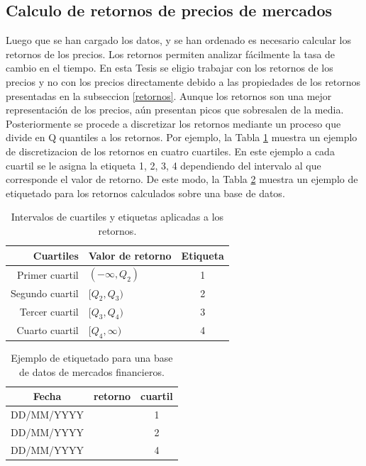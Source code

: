 \subsection{Calculo de retornos de precios de mercados}
\label{sec_retornos}
Luego que se han cargado los datos, y se han ordenado es necesario calcular los retornos de los precios. 
Los retornos permiten analizar fácilmente la tasa de cambio en el tiempo.
En esta Tesis se eligio trabajar con los retornos de los precios y no con los precios directamente debido a las propiedades de los retornos presentadas en la subseccion \ref{retornos}.
Aunque los retornos son una mejor representación de los precios, aún presentan picos que sobresalen de la media. 
Posteriormente se procede a discretizar los retornos mediante un proceso que divide en Q quantiles a los retornos.
Por ejemplo, la Tabla \ref{quantile_example} muestra un ejemplo de discretizacion de los retornos en cuatro cuartiles. 
En este ejemplo a cada cuartil se le asigna la etiqueta 1, 2, 3, 4 dependiendo del intervalo al que corresponde el valor de retorno.
De este modo, la Tabla \ref{ejemplo_data-returns} muestra un ejemplo de etiquetado para los retornos calculados sobre una base de datos.

\begin{table}	
\begin{center}
	\begin{tabular}{ |r | l | c| }
		\hline
		Cuartiles &  Valor de retorno & Etiqueta  \\ \hline
		Primer cuartil & $(-\infty , Q_2)$ & 1 \\
		Segundo cuartil & $[Q_2 , Q_3)$   & 2\\ 
		Tercer cuartil &  $[Q_3 , Q_4)$   & 3 \\
		Cuarto cuartil & $[Q_4 , \infty)$ &4\\ 
		\hline
	\end{tabular}
	\label{quantile_example}
		\caption{Intervalos de cuartiles y etiquetas aplicadas a los retornos.}
\end{center}
\end{table}


\begin{table}
	\begin{center}
	\begin{tabular}{|c|c|c|}
		\hline 
		Fecha & retorno & cuartil \\ 
		\hline 
		DD/MM/YYYY & $$$$ & 1\\ 
		DD/MM/YYYY & $$$$ & 2\\ 
		DD/MM/YYYY & $$$$ & 4\\ 
		\hline 
	\end{tabular} 
	\label{ejemplo_data-returns}
	\caption{Ejemplo de etiquetado para una base de datos de mercados financieros.}
\end{center}
\end{table}

